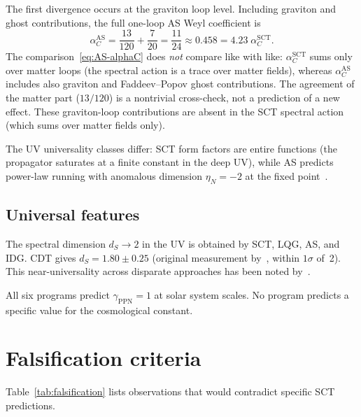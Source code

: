\documentclass[12pt,a4paper]{article}
\theoremstyle{plain}
\theoremstyle{definition}
\theoremstyle{remark}
\begin{document}
The first divergence occurs at the graviton loop level.
Including graviton and ghost contributions, the full one-loop
AS Weyl coefficient
is~\cite{SCM:2010}
\begin{equation}\label{eq:AS-alphaC}
  \alpha_C^{\mathrm{AS}} = \frac{13}{120} + \frac{7}{20}
  = \frac{11}{24} \approx 0.458
  = 4.23\;\alpha_C^{\mathrm{SCT}}.
\end{equation}
The comparison~\eqref{eq:AS-alphaC} does \emph{not} compare
like with like: $\alpha_C^{\mathrm{SCT}}$ sums only over matter
loops (the spectral action is a trace over matter fields),
whereas $\alpha_C^{\mathrm{AS}}$ includes also graviton and
Faddeev--Popov ghost contributions.  The agreement of the matter
part ($13/120$) is a nontrivial cross-check, not a prediction
of a new effect.  These graviton-loop contributions are absent in
the SCT spectral action (which sums over matter fields only).

The UV universality classes differ: SCT form factors are entire
functions (the propagator saturates at a finite constant in the
deep UV), while AS predicts power-law running with anomalous
dimension $\eta_N = -2$ at the fixed
point~\cite{KRS:2022}.

\subsection{Universal features}
\label{sec:universal}

The spectral dimension $d_S \to 2$ in the UV is obtained by
SCT, LQG, AS, and IDG.  CDT gives $d_S = 1.80 \pm 0.25$
(original measurement
by~\cite{AJL:2005}, within $1\sigma$ of~2).  This
near-universality across disparate approaches has been noted
by~\cite{Carlip:2017}.

All six programs predict $\gamma_{\mathrm{PPN}} = 1$ at solar
system scales.  No program predicts a specific value for the
cosmological constant.

\section{Falsification criteria}
\label{sec:falsification}

Table~\ref{tab:falsification} lists observations that would
contradict specific SCT predictions.
\end{document}
